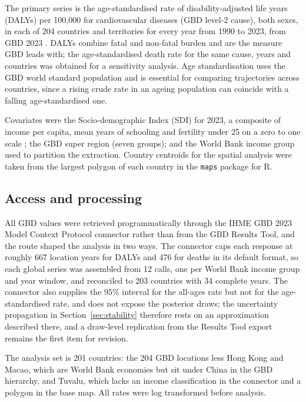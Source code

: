\documentclass[11pt,a4paper]{article}
\begin{document}
The primary series is the age-standardised rate of disability-adjusted life years (DALYs) per 100,000 for cardiovascular diseases (GBD level-2 cause), both sexes, in each of 204 countries and territories for every year from 1990 to 2023, from GBD 2023 \citep{gbd2023dalys}. DALYs combine fatal and non-fatal burden and are the measure GBD leads with; the age-standardised death rate for the same cause, years and countries was obtained for a sensitivity analysis. Age standardisation uses the GBD world standard population and is essential for comparing trajectories across countries, since a rising crude rate in an ageing population can coincide with a falling age-standardised one.

Covariates were the Socio-demographic Index (SDI) for 2023, a composite of income per capita, mean years of schooling and fertility under 25 on a zero to one scale \citep{gbd2023dalys}; the GBD super region (seven groups); and the World Bank income group used to partition the extraction. Country centroids for the spatial analysis were taken from the largest polygon of each country in the \texttt{maps} package for R.

\subsection{Access and processing}

All GBD values were retrieved programmatically through the IHME GBD 2023 Model Context Protocol connector rather than from the GBD Results Tool, and the route shaped the analysis in two ways. The connector caps each response at roughly 667 location years for DALYs and 476 for deaths in its default format, so each global series was assembled from 12 calls, one per World Bank income group and year window, and reconciled to 203 countries with 34 complete years. The connector also supplies the 95\% interval for the all-ages rate but not for the age-standardised rate, and does not expose the posterior draws; the uncertainty propagation in Section~\ref{sec:stability} therefore rests on an approximation described there, and a draw-level replication from the Results Tool export remains the first item for revision.

The analysis set is 201 countries: the 204 GBD locations less Hong Kong and Macao, which are World Bank economies but sit under China in the GBD hierarchy, and Tuvalu, which lacks an income classification in the connector and a polygon in the base map. All rates were log transformed before analysis.
\end{document}
